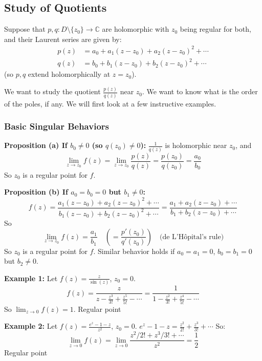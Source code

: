 \subsection{Study of Quotients}

Suppose that $p, q: D \setminus \{z_0\} \longrightarrow \mathbb{C}$ are holomorphic with $z_0$ being regular for both, and their Laurent series are given by:
\begin{align*}
    p(z) &= a_0 + a_1(z-z_0) + a_2(z-z_0)^2 + \cdots \\
    q(z) &= b_0 + b_1(z-z_0) + b_2(z-z_0)^2 + \cdots
\end{align*}
(so $p, q$ extend holomorphically at $z = z_0$).

We want to study the quotient $\frac{p(z)}{q(z)}$ near $z_0$. We want to know what is the order of the poles, if any. We will first look at a few instructive examples.

\subsubsection{Basic Singular Behaviors}

\noindent\textbf{Proposition (a) If $b_0 \ne 0$ (so $q(z_0) \ne 0$):} $\frac{1}{q(z)}$ is holomorphic near $z_0$, and 
\[
    \lim_{z \to z_0} f(z) = \lim_{z \to z_0} \frac{p(z)}{q(z)} = \frac{p(z_0)}{q(z_0)} = \frac{a_0}{b_0}
\]
So $z_0$ is a regular point for $f$.

\medskip
\noindent\textbf{Proposition (b) If $a_0 = b_0 = 0$ but $b_1 \ne 0$:}
\[
    f(z) = \frac{a_1(z-z_0) + a_2(z-z_0)^2 + \cdots}{b_1(z-z_0) + b_2(z-z_0)^2 + \cdots} = \frac{a_1 + a_2(z-z_0) + \cdots}{b_1 + b_2(z-z_0) + \cdots}
\]
So 
\[
    \lim_{z \to z_0} f(z) = \frac{a_1}{b_1} \quad \left( = \frac{p'(z_0)}{q'(z_0)} \right) \quad \text{(de L'Hôpital's rule)}
\]
So $z_0$ is a regular point for $f$. Similar behavior holds if $a_0 = a_1 = 0$, $b_0 = b_1 = 0$ but $b_2 \ne 0$.

\pagebreak
\noindent\textbf{Example 1:} Let $f(z) = \frac{z}{\sin(z)}$, $z_0 = 0$.
\[
    f(z) = \frac{z}{z - \frac{z^3}{3!} + \frac{z^5}{5!} - \cdots} = \frac{1}{1 - \frac{z^2}{3!} + \frac{z^4}{5!} - \cdots}
\]
So $\lim_{z \to 0} f(z) = 1$. \quad Regular point \checkmark

\medskip
\noindent\textbf{Example 2:} Let $f(z) = \frac{e^z - 1 - z}{z^2}$, $z_0 = 0$.
$e^z - 1 - z = \frac{z^2}{2!} + \frac{z^3}{3!} + \cdots$
So:
\[
    \lim_{z \to 0} f(z) = \lim_{z \to 0} \frac{z^2/2! + z^3/3! + \cdots}{z^2} = \frac{1}{2}
\]
Regular point \checkmark

